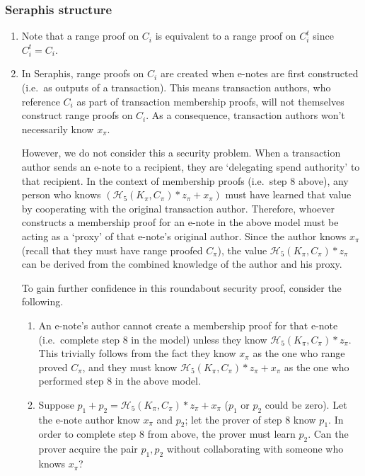 \begin{appendices}
\subsubsection{Seraphis structure}

\begin{enumerate}
    \item Note that a range proof on $C_i$ is equivalent to a range proof on $C^t_i$ since $C^t_i = C_i$.

    \item In Seraphis, range proofs on $C_i$ are created when e-notes are first constructed (i.e.\ as outputs of a transaction). This means transaction authors, who reference $C_i$ as part of transaction membership proofs, will not themselves construct range proofs on $C_i$. As a consequence, transaction authors won't necessarily know $x_{\pi}$.

    However, we do not consider this a security problem. When a transaction author sends an e-note to a recipient, they are `delegating spend authority' to that recipient. In the context of membership proofs (i.e.\ step 8 above), any person who knows $(\mathcal{H}_5(K_{\pi}, C_{\pi})*z_{\pi} + x_{\pi})$ must have learned that value by cooperating with the original transaction author. Therefore, whoever constructs a membership proof for an e-note in the above model must be acting as a `proxy' of that e-note's original author. Since the author knows $x_{\pi}$ (recall that they must have range proofed $C_{\pi}$), the value $\mathcal{H}_5(K_{\pi}, C_{\pi})*z_{\pi}$ can be derived from the combined knowledge of the author and his proxy.

    To gain further confidence in this roundabout security proof, consider the following.
    \begin{enumerate}
        \item An e-note's author cannot create a membership proof for that e-note (i.e.\ complete step 8 in the model) unless they know $\mathcal{H}_5(K_{\pi}, C_{\pi})*z_{\pi}$. This trivially follows from the fact they know $x_{\pi}$ as the one who range proved $C_{\pi}$, and they must know $\mathcal{H}_5(K_{\pi}, C_{\pi})*z_{\pi} + x_{\pi}$ as the one who performed step 8 in the above model.

        \item Suppose $p_1 + p_2 = \mathcal{H}_5(K_{\pi}, C_{\pi})*z_{\pi} + x_{\pi}$ ($p_1$ or $p_2$ could be zero). Let the e-note author know $x_{\pi}$ and $p_2$; let the prover of step 8 know $p_1$. In order to complete step 8 from above, the prover must learn $p_2$. Can the prover acquire the pair $p_1, p_2$ without collaborating with someone who knows $x_{\pi}$?


\end{enumerate}
\end{enumerate}
\end{appendices}
